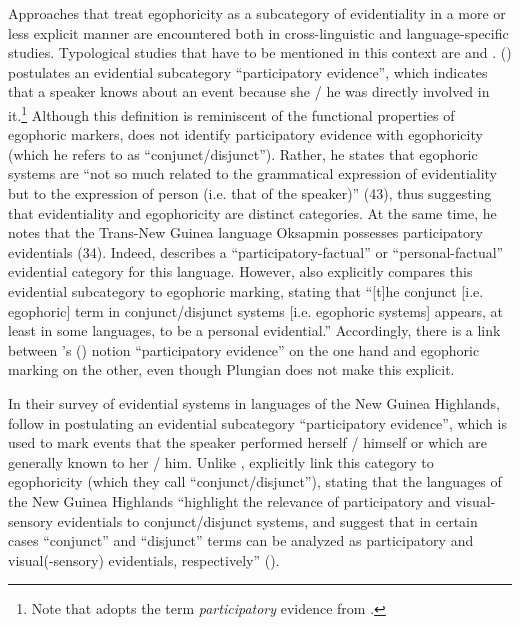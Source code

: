 \documentclass[output=paper]{langsci/langscibook}
\begin{document}
Approaches that treat egophoricity as a subcategory of evidentiality in a more or less explicit manner are encountered both in cross-linguistic and language-specific studies. Typological studies that have to be mentioned in this context are \cite{Plungian2010} and \cite{SanRoqueLoughnane2012}. \citeauthor{Plungian2010} (\citeyear[34]{Plungian2010}) postulates an evidential subcategory “participatory evidence”, which indicates that a speaker knows about an event because she / he was directly involved in it.\footnote{Note that \cite{Plungian2010} adopts the term \emph{participatory} evidence from \cite{Oswalt1986}.} Although this definition is reminiscent of the functional properties of egophoric markers, \citeauthor{Plungian2010} does not identify participatory evidence with egophoricity (which he refers to as “conjunct/disjunct”). Rather, he states that egophoric systems are “not so much related to the grammatical expression of evidentiality but to the expression of person (i.e. that of the speaker)” (43), thus suggesting that evidentiality and egophoricity are distinct categories. At the same time, he notes that the Trans-New Guinea language Oksapmin possesses participatory evidentials (34).
Indeed, \cite{Loughnane2009} describes a “participatory-factual” or “personal-factual” evidential category for this language. However, \cite[253]{Loughnane2009} also explicitly compares this evidential subcategory to egophoric marking, stating that “[t]he conjunct [i.e. egophoric] term in conjunct/disjunct systems [i.e. egophoric systems] appears, at least in some languages, to be a personal evidential.” Accordingly, there is a link between \citeauthor{Plungian2010}’s (\citeyear{Plungian2010}) notion “participatory evidence” on the one hand and egophoric marking on the other, even though Plungian does not make this explicit.

In their survey of evidential systems in languages of the New Guinea Highlands, \cite{SanRoqueLoughnane2012} follow \cite{Plungian2010} in postulating an evidential subcategory “participatory evidence”, which is used to mark events that the speaker performed herself / himself or which are generally known to her / him. Unlike \cite{Plungian2010}, \citeauthor{SanRoqueLoughnane2012} explicitly link this category to egophoricity (which they call “conjunct/disjunct”), stating that the languages of the New Guinea Highlands “highlight the relevance of participatory and visual-sensory evidentials to conjunct/disjunct systems, and suggest that in certain cases “conjunct” and “disjunct” terms can be analyzed as participatory and visual(-sensory) evidentials, respectively” (\citeyear[158]{SanRoqueLoughnane2012}).
\end{document}
